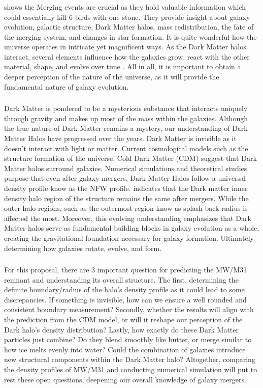 \documentclass[linenumbers]{aastex631}
\begin{document}
\subsubsection{}
 \citep{Frenk_2012} shows the Merging events are crucial as they hold valuable information which could essentially kill 6 birds with one stone. They provide insight about galaxy evolution, galactic structure, Dark Matter halos, mass redistribution, the fate of the merging system, and changes in star formation. It is quite wonderful how the universe operates in intricate yet magnificent ways. As the Dark Matter halos interact, several elements influence how the galaxies grow, react with the other material, shape, and evolve over time \citep{Frenk_2012}. All in all, it is important to obtain a deeper perception of the nature of the universe, as it will provide the fundamental nature of galaxy evolution. 
\subsubsection{}
Dark Matter is pondered to be a mysterious substance that interacts uniquely through gravity and makes up most of the mass within the galaxies. Although the true nature of Dark Matter remains a mystery, our understanding of Dark Matter Halos have progressed over the years. Dark Matter is invisible as it doesn't interact with light or matter. Current cosmological models such as the structure formation of the universe, Cold Dark Matter (CDM) suggest that Dark Matter halos surround galaxies. Numerical simulations and theoretical studies purpose that even after galaxy mergers, Dark Matter Halos follow a universal density profile know as the NFW profile. \cite{2019MNRAS.487..993D} indicates that the Dark matter inner density halo region of the structure remains the same after mergers. While the outer halo regions, such as the outermost region know as splash back radius is affected the most.  Moreover, this evolving understanding emphasizes that Dark Matter halos serve as fundamental building blocks in galaxy evolution as a whole, creating the gravitational foundation necessary for galaxy formation. Ultimately determining how galaxies rotate, evolve, and form.
\subsubsection{}
 For this proposal, there are 3 important question for predicting the MW/M31 remnant and understanding its overall structure. The first, determining the definite boundary/radius of the halo's density profile as it could lead to some discrepancies. If something is invisible, how can we ensure a  well rounded and consistent boundary measurement? Secondly, whether the results will align with the prediction from the CDM model, or will it reshape our perception of the Dark halo's density distribution? Lastly, how exactly do these Dark Matter particles just combine? Do they blend smoothly like butter, or merge similar to how ice melts evenly into water? Could the combination of galaxies introduce new structural components within the Dark Matter halo? Altogether, comparing the density profiles of MW/M31 and conducting numerical simulation will put to rest these open questions, deepening our overall knowledge of galaxy mergers.
\end{document}
